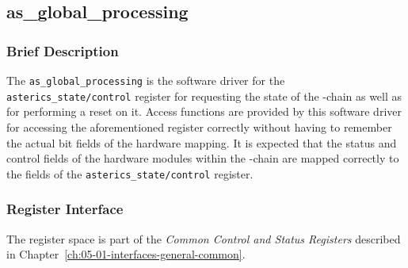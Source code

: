 
\subsection{as\_global\_processing}



\subsubsection{Brief Description}
The \texttt{as\_global\_processing} is the software driver for the \texttt{asterics\_state/control} register for requesting the state of the \asterics-chain as well as for performing a reset on it.
Access functions are provided by this software driver for accessing the aforementioned register correctly without having to remember the actual bit fields of the hardware mapping.
It is expected that the status and control fields of the hardware modules within the \asterics-chain are mapped correctly to the fields of the \texttt{asterics\_state/control} register.


\subsubsection{Register Interface}
The register space is part of the \textit{Common Control and Status Registers} described in Chapter~\ref{ch:05-01-interfaces-general-common}.